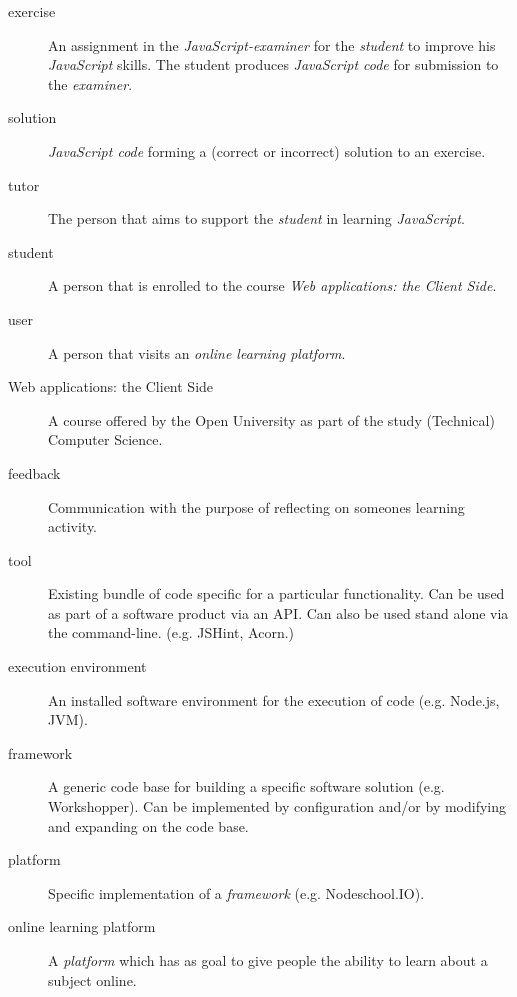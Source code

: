 \documentclass{article}
\begin{document}
\begin{description}
  \item[exercise] An assignment in the {\em JavaScript-examiner} for the {\em
    student} to improve his {\em JavaScript} skills. The student produces
    {\em JavaScript code} for submission to the {\em examiner}.
  \item[solution] {\em JavaScript code} forming a (correct or incorrect)
    solution to an exercise.
  \item[tutor] The person that aims to support the {\em student} in learning
    {\em JavaScript}.
  \item[student] A person that is enrolled to the course {\em Web applications:
    the Client Side}.
  \item[user] A person that visits an {\em online learning platform}.
  \item[Web applications: the Client Side] A course offered by the Open
    University as part of the study (Technical) Computer Science.
  \item[feedback] Communication with the purpose of reflecting on someones 
    learning activity.
  \item[tool] Existing bundle of code specific for a particular
    functionality. Can be used as part of a software product via an API. Can
    also be used stand alone via the command-line. (e.g. JSHint, Acorn.)
  \item[execution environment] An installed software environment for the
    execution of code (e.g. Node.js, JVM).
  \item[framework] A generic code base for building a specific software
    solution (e.g. Workshopper). Can be implemented by configuration and/or by
    modifying and expanding on the code base.
  \item[platform] Specific implementation of a {\em framework}
    (e.g. Nodeschool.IO).
  \item[online learning platform] A {\em platform} which has as goal to give
    people the ability to learn about a subject online.
\end{description}
\end{document}
